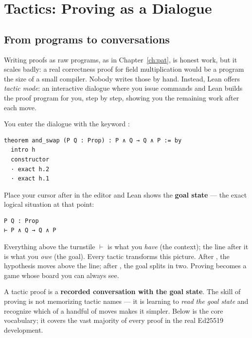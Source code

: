 \chapter{Tactics: Proving as a Dialogue}
\label{ch:tactics}

\section{From programs to conversations}

Writing proofs as raw programs, as in Chapter~\ref{ch:pat}, is honest work,
but it scales badly: a real correctness proof for field multiplication would
be a program the size of a small compiler. Nobody writes those by hand.
Instead, Lean offers \emph{tactic mode}: an interactive dialogue where you
issue commands and Lean builds the proof program for you, step by step,
showing you the remaining work after each move.

You enter the dialogue with the keyword :

\begin{lstlisting}[language=Lean]
theorem and_swap (P Q : Prop) : P ∧ Q → Q ∧ P := by
  intro h
  constructor
  · exact h.2
  · exact h.1
\end{lstlisting}

Place your cursor after  in the editor and Lean shows the
\textbf{goal state} --- the exact logical situation at that point:

\begin{lstlisting}
P Q : Prop
⊢ P ∧ Q → Q ∧ P
\end{lstlisting}

Everything above the turnstile \(\vdash\) is what you \emph{have} (the
context); the line after it is what you \emph{owe} (the goal). Every tactic
transforms this picture. After , the hypothesis moves above the
line; after , the goal splits in two. Proving becomes a
game whose board you can always see.

\begin{bigidea}
A tactic proof is a \textbf{recorded conversation with the goal state}. The
skill of proving is not memorizing tactic names --- it is learning to
\emph{read the goal state} and recognize which of a handful of moves makes it
simpler. Below is the core vocabulary; it covers the vast majority of every
proof in the real Ed25519 development.
\end{bigidea}

